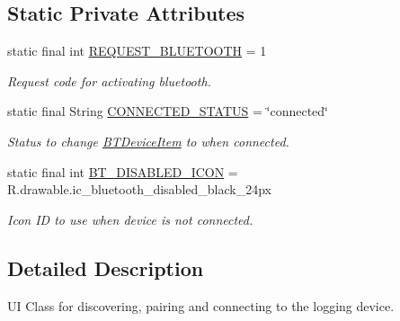\subsection*{Static Private Attributes}
\begin{DoxyCompactItemize}
\item 
\mbox{\label{classcom_1_1jack_1_1motorbikestatistics_1_1_pair_device_fragment_ad6297326ae50ec30b7936e190beba44b}} 
static final int \hyperlink{classcom_1_1jack_1_1motorbikestatistics_1_1_pair_device_fragment_ad6297326ae50ec30b7936e190beba44b}{R\+E\+Q\+U\+E\+S\+T\+\_\+\+B\+L\+U\+E\+T\+O\+O\+TH} = 1
\begin{DoxyCompactList}\small\item\em Request code for activating bluetooth. \end{DoxyCompactList}\item 
\mbox{\label{classcom_1_1jack_1_1motorbikestatistics_1_1_pair_device_fragment_a99e2ea55ac395622e937982582b2a6bf}} 
static final String \hyperlink{classcom_1_1jack_1_1motorbikestatistics_1_1_pair_device_fragment_a99e2ea55ac395622e937982582b2a6bf}{C\+O\+N\+N\+E\+C\+T\+E\+D\+\_\+\+S\+T\+A\+T\+US} = \char`\"{}connected\char`\"{}
\begin{DoxyCompactList}\small\item\em Status to change \hyperlink{classcom_1_1jack_1_1motorbikestatistics_1_1_b_t_device_item}{B\+T\+Device\+Item} to when connected. \end{DoxyCompactList}\item 
\mbox{\label{classcom_1_1jack_1_1motorbikestatistics_1_1_pair_device_fragment_a27b366d93919d4f48ab58834ce40b117}} 
static final int \hyperlink{classcom_1_1jack_1_1motorbikestatistics_1_1_pair_device_fragment_a27b366d93919d4f48ab58834ce40b117}{B\+T\+\_\+\+D\+I\+S\+A\+B\+L\+E\+D\+\_\+\+I\+C\+ON} = R.\+drawable.\+ic\+\_\+bluetooth\+\_\+disabled\+\_\+black\+\_\+24px
\begin{DoxyCompactList}\small\item\em Icon ID to use when device is not connected. \end{DoxyCompactList}\end{DoxyCompactItemize}


\subsection{Detailed Description}
UI Class for discovering, pairing and connecting to the logging device. 

